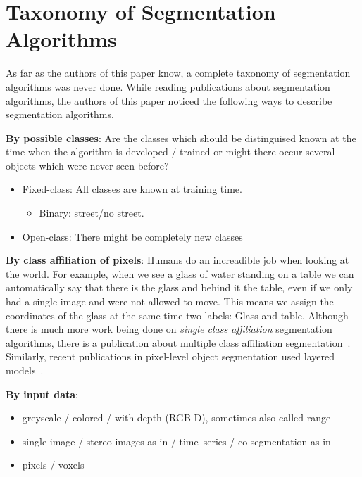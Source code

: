 \section{Taxonomy of Segmentation Algorithms}\label{sec:taxonomy}
As far as the authors of this paper know, a complete taxonomy of segmentation
algorithms was never done. While reading publications about segmentation
algorithms, the authors of this paper noticed the following ways to describe
segmentation algorithms.

\textbf{By possible classes}: Are the classes which should be distinguised
known at the time when the algorithm is developed / trained or might there
occur several objects which were never seen before?
\begin{itemize}
    \item Fixed-class: All classes are known at training time.
          \begin{itemize}
              \item Binary: street/no street.
          \end{itemize}
    \item Open-class: There might be completely new classes
\end{itemize}

\textbf{By class affiliation of pixels}: Humans do an increadible job when
looking at the world. For example, when we see a glass of water standing on a
table we can automatically say that there is the glass and behind it the table,
even if we only had a single image and were not allowed to move. This means we
assign the coordinates of the glass at the same time two labels: Glass and
table. Although there is much more work being done on \textit{single class
affiliation} segmentation algorithms, there is a publication about multiple
class affiliation segmentation~\cite{levin2008spectral}. Similarly, recent
publications in pixel-level object segmentation used layered
models~\cite{yang2012layered}.

\textbf{By input data}:
\begin{itemize}
    \item greyscale / colored / with depth (RGB-D), sometimes also called
          range~\cite{hoover1996experimental}
    \item single image / stereo images as in \cite{boykov2001fast} /
          time~series / co-segmentation as in~\cite{1640859}
    \item pixels / voxels \cite{wolz2012multi}
\end{itemize}

